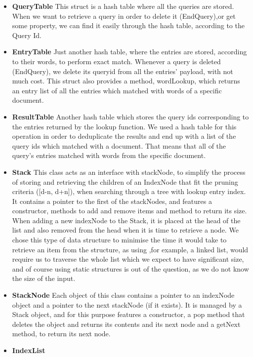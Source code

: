 \documentclass{article}
\begin{document}
\begin{itemize}
  \item \textbf{QueryTable}
  This struct is a hash table where all the queries are stored. When we want to retrieve a query in order to delete it (EndQuery),or get some property, we can find it easily through the hash table, according to the Query Id.
  \item \textbf{EntryTable} 
  Just another hash table, where the entries are stored, according to their words, to perform exact match. Whenever a query is deleted (EndQuery), we delete its queryid from all the entries' payload, with not much cost. This struct also provides a method, wordLookup, which returns an entry list of all the entries which matched with words of a specific document.
  \item \textbf{ResultTable}
  Another hash table which stores the query ids corresponding to the entries returned by the lookup function. We used a hash table for this operation in order to deduplicate the results and end up with a list of the query ids which matched with a document. That means that all of the query's entries matched with words from the specific document.
  \item \textbf{Stack}
  This class acts as an interface with stackNode, to simplify the process of storing and retrieving the children of an IndexNode that fit the pruning criteria ([d-n, d+n]), when searching through a tree with lookup entry index. It contains a pointer to the first of the stackNodes, and features a constructor, methods to add and remove items and method to return its size. When adding a new indexNode to the Stack, it is placed at the head of the list and also removed from the head when it is time to retrieve a node. We chose this type of data structure to minimise the time it would take to retrieve an item from the structure, as using ,for example, a linked list, would require us to traverse the whole list which we expect to have significant size, and of course using static structures is out of the question, as we do not know the size of the input.
  \item \textbf{StackNode}
  Each object of this class contains a pointer to an indexNode object and a pointer to the next stackNode (if it exists). It is managed by a Stack object, and for this purpose features a constructor, a pop method that deletes the object and returns its contents and its next node and a getNext method, to return its next node.
  \item \textbf{IndexList}

\end{itemize}
\end{document}
